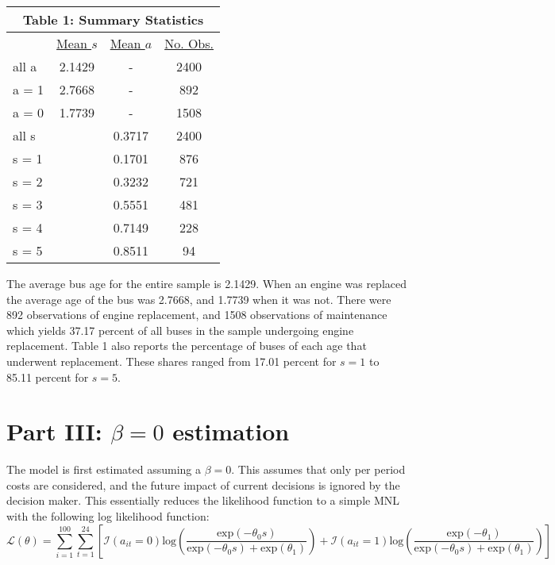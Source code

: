 \documentclass[11pt]{article}
\begin{document}
\begin{center}
\begin{tabular}{lccc}
\hline\hline
\multicolumn{4}{c}{\textbf{Table 1: Summary Statistics}}\\
\hline
& \underline{Mean $s$} & \underline{Mean $a$}  & \underline{No. Obs.} \\
all a & 2.1429 & - & 2400 \\
a = 1 & 2.7668 & - & 892 \\
a = 0 & 1.7739 & - & 1508 \\
all s &  & 0.3717 & 2400 \\
s = 1 & & 0.1701 & 876 \\
s = 2 & & 0.3232 & 721 \\
s = 3 & & 0.5551 & 481 \\
s = 4 & & 0.7149 & 228 \\
s = 5 & & 0.8511 & 94 \\
\hline\hline
\end {tabular}
\end{center}

The average bus age for the entire sample is 2.1429.  When an engine was replaced the average age of the bus was 2.7668, and 1.7739 when it was not.  There were 892 observations of engine replacement, and 1508 observations of maintenance which yields 37.17 percent of all buses in the sample undergoing engine replacement.  Table 1 also reports the percentage of buses of each age that underwent replacement.  These shares ranged from 17.01 percent for $s = 1$ to 85.11 percent for $s = 5$.  
    
\section*{Part III: $\beta=0$ estimation}
\indent

The model is first estimated assuming a $\beta=0$.  This assumes that only per period costs are considered, and the future impact of current decisions is ignored by the decision maker.  This essentially reduces the likelihood function to a simple MNL with the following log likelihood function:
\begin{equation*}
\mathcal{L}(\theta) = \sum_{i=1}^{100} \sum_{t=1}^{24} \left[\mathcal{I}(a_{it}=0)\text{log}\left(\frac{\text{exp}(-\theta_{0}s)}{\text{exp}(-\theta_{0}s) + \text{exp}(\theta_{1})}\right) + \mathcal{I}(a_{it}=1)\text{log}\left(\frac{\text{exp}(-\theta_{1})}{\text{exp}(-\theta_{0}s) + \text{exp}(\theta_{1})}\right)\right]
\end{equation*}
\end{document}
